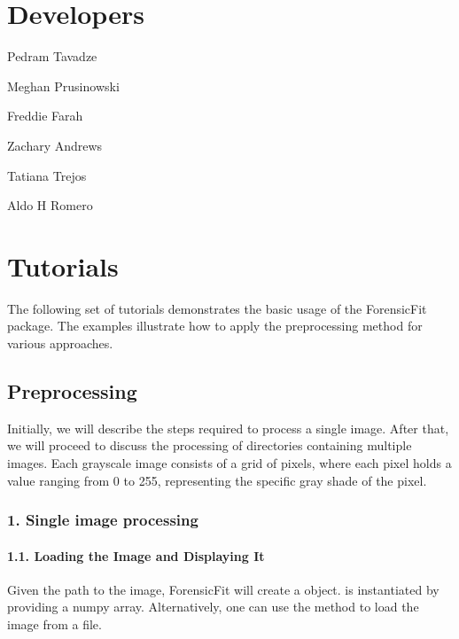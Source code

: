 \documentclass[letterpaper,10pt,english]{sphinxmanual}
\begin{document}
\sphinxstepscope


\section{Developers}
\label{\detokenize{developers:developers}}\label{\detokenize{developers::doc}}
\sphinxAtStartPar
Pedram Tavadze

\sphinxAtStartPar
Meghan Prusinowski

\sphinxAtStartPar
Freddie Farah

\sphinxAtStartPar
Zachary Andrews

\sphinxAtStartPar
Tatiana Trejos

\sphinxAtStartPar
Aldo H Romero

\sphinxstepscope


\section{Tutorials}
\label{\detokenize{tutorials:tutorials}}\label{\detokenize{tutorials::doc}}
\sphinxAtStartPar
The following set of tutorials demonstrates the basic usage of the ForensicFit package. The examples illustrate how to apply the preprocessing method for various approaches.


\subsection{Preprocessing}
\label{\detokenize{tutorials:preprocessing}}
\sphinxAtStartPar
Initially, we will describe the steps required to process a single image. After that, we will proceed to discuss the processing of directories containing multiple images.
Each grayscale image consists of a grid of pixels, where each pixel holds a value ranging from 0 to 255, representing the specific gray shade of the pixel.


\subsubsection{1. Single image processing}
\label{\detokenize{tutorials:single-image-processing}}

\paragraph{1.1. Loading the Image and Displaying It}
\label{\detokenize{tutorials:loading-the-image-and-displaying-it}}
\sphinxAtStartPar
Given the path to the image, ForensicFit will create a  object.
 is instantiated by providing a numpy array. Alternatively, one can use the  method to load the image from a file.
\end{document}
